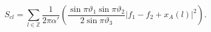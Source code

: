 \begin{equation}
S_{cl}=\sum_{l \in \mathbb{Z}}\frac{1}{2 \pi \alpha'}\left( \frac{\sin
      \pi \vartheta_{1} \sin \pi \vartheta_{2}}{2 \sin \pi \vartheta_{3}}|f_{1}-f_{2}+x_{A}(l)|^{2}\right).
\end{equation}

